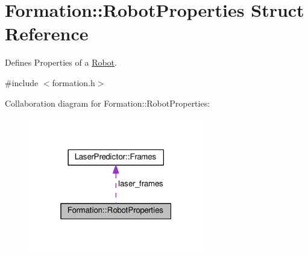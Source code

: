 \hypertarget{structFormation_1_1RobotProperties}{}\section{Formation\+:\+:Robot\+Properties Struct Reference}
\label{structFormation_1_1RobotProperties}


Defines Properties of a \hyperlink{structFormation_1_1Robot}{Robot}.  




{\ttfamily \#include $<$formation.\+h$>$}



Collaboration diagram for Formation\+:\+:Robot\+Properties\+:\nopagebreak
\begin{figure}[H]
\begin{center}
\leavevmode
\includegraphics[width=217pt]{de/d82/structFormation_1_1RobotProperties__coll__graph}
\end{center}
\end{figure}
